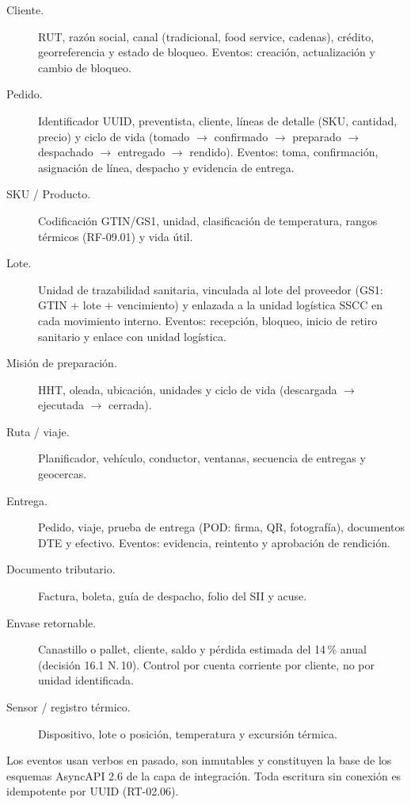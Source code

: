 \begin{description}
\item[Cliente.] RUT, razón social, canal (tradicional, food service, cadenas),
  crédito, georreferencia y estado de bloqueo.  Eventos: creación,
  actualización y cambio de bloqueo.

\item[Pedido.] Identificador UUID, preventista, cliente, líneas de detalle
  (SKU, cantidad, precio) y ciclo de vida (tomado $\to$ confirmado $\to$
  preparado $\to$ despachado $\to$ entregado $\to$ rendido).  Eventos: toma,
  confirmación, asignación de línea, despacho y evidencia de entrega.

\item[SKU / Producto.] Codificación GTIN/GS1, unidad, clasificación de
  temperatura, rangos térmicos (RF-09.01) y vida útil.

\item[Lote.] Unidad de trazabilidad sanitaria, vinculada al lote del
  proveedor (GS1: GTIN + lote + vencimiento) y enlazada a la unidad logística
  SSCC en cada movimiento interno.  Eventos: recepción, bloqueo, inicio de
  retiro sanitario y enlace con unidad logística.

\item[Misión de preparación.] HHT, oleada, ubicación, unidades y ciclo de vida
  (descargada $\to$ ejecutada $\to$ cerrada).

\item[Ruta / viaje.] Planificador, vehículo, conductor, ventanas, secuencia de
  entregas y geocercas.

\item[Entrega.] Pedido, viaje, prueba de entrega (POD: firma, QR, fotografía),
  documentos DTE y efectivo.  Eventos: evidencia, reintento y aprobación de
  rendición.

\item[Documento tributario.] Factura, boleta, guía de despacho, folio del SII
  y acuse.

\item[Envase retornable.] Canastillo o pallet, cliente, saldo y pérdida
  estimada del 14\,\% anual (decisión 16.1 N.\textdegree\,10).  Control por
  cuenta corriente por cliente, no por unidad identificada.

\item[Sensor / registro térmico.] Dispositivo, lote o posición, temperatura y
  excursión térmica.
\end{description}

Los eventos usan verbos en pasado, son inmutables y constituyen la base de los
esquemas AsyncAPI 2.6 de la capa de integración.  Toda escritura sin conexión
es idempotente por UUID (RT-02.06).

